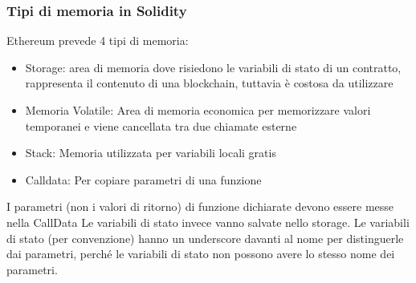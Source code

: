 \documentclass[a4paper]{article}
\begin{document}
\subsubsection{Tipi di memoria in Solidity}

Ethereum prevede 4 tipi di memoria:
\begin{itemize}
    \item Storage: area di memoria dove risiedono le variabili di stato di un contratto, rappresenta il contenuto di una blockchain, tuttavia è costosa da utilizzare
    \item Memoria Volatile: Area di memoria economica per memorizzare valori temporanei e viene cancellata tra due chiamate esterne
    \item Stack: Memoria utilizzata per variabili locali gratis
    \item Calldata: Per copiare parametri di una funzione
\end{itemize}
I parametri (non i valori di ritorno) di funzione dichiarate devono essere messe nella CallData
Le variabili di stato invece vanno salvate nello storage.
Le variabili di stato (per convenzione) hanno un underscore davanti al nome per distinguerle dai parametri, perché le variabili di stato non possono avere lo stesso nome dei parametri.
\end{document}
